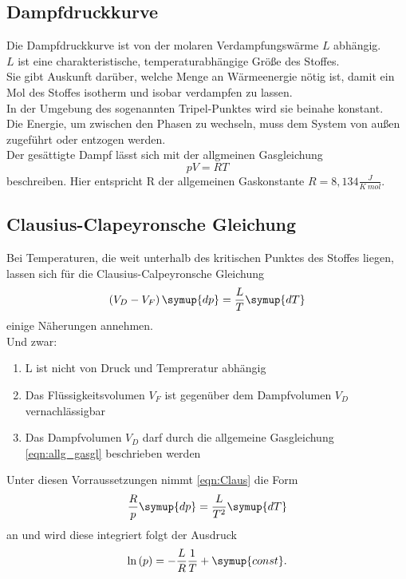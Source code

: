 \subsection{Dampfdruckkurve}
\label{subsec:Dampfdruckkurve}
Die Dampfdruckkurve ist von der molaren Verdampfungswärme $L$ abhängig.\\
$L$ ist eine charakteristische, temperaturabhängige Größe des Stoffes.\\
Sie gibt Auskunft darüber, welche Menge an Wärmeenergie nötig ist, damit 
ein Mol des Stoffes isotherm und isobar verdampfen zu lassen. \\
In der Umgebung des sogenannten Tripel-Punktes wird sie beinahe konstant. \\  
Die Energie, um zwischen den Phasen zu wechseln, muss dem System von außen zugeführt oder 
entzogen werden.\\
Der gesättigte Dampf lässt sich mit der allgmeinen Gasgleichung
\begin{equation}
    pV = RT
\label{eqn:allg_gasgl}
\end{equation}
beschreiben. Hier entspricht R der allgemeinen Gaskonstante $R = 8,134 \frac{J}{K\:mol}$. \\


\subsection{Clausius-Clapeyronsche Gleichung}
\label{subsec:Clausius-Clapeyron}
Bei Temperaturen, die weit unterhalb des kritischen Punktes des Stoffes liegen,
lassen sich für die Clausius-Calpeyronsche Gleichung
\begin{equation}
    \label{eqn:Claus}
    \left(V_D-V_F\right)\symup{dp} = \frac{L}{T}\symup{dT}
\end{equation}
einige Näherungen annehmen. \\
Und zwar:

\begin{enumerate}
    \item L ist nicht von Druck und Tempreratur abhängig
    \item Das Flüssigkeitsvolumen $V_F$ ist gegenüber dem Dampfvolumen $V_D$ vernachlässigbar
    \item Das Dampfvolumen $V_D$ darf durch die allgemeine Gasgleichung \autoref{eqn:allg_gasgl} beschrieben werden
\end{enumerate}
Unter diesen Vorraussetzungen nimmt \eqref{eqn:Claus} die Form
\begin{equation*}
    \frac{R}{p}\symup{dp} = \frac{L}{T^2}\symup{dT}
\end{equation*}
an und wird diese integriert folgt der Ausdruck
\begin{equation}
    \label{eqn:ClausInt}
    \ln\left(p\right) = -\frac{L}{R}\frac{1}{T} + \symup{const}.
\end{equation}
